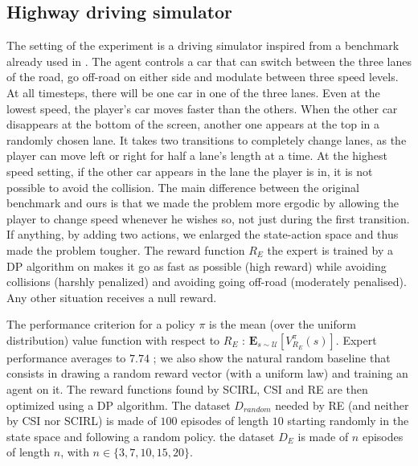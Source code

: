 \documentclass{llncs}
\begin{document}
\subsection{Highway driving simulator}
\label{subsec:highway}
The setting of the experiment is a driving simulator inspired from a benchmark already used in \cite{syed2008apprenticeship,syed2008game}. The agent controls a car that can switch between the three lanes of the road, go off-road on either side and modulate between three speed levels. At all timesteps, there will be one car in one of the three lanes. Even at the lowest speed, the player's car moves faster than the others. When the other car disappears at the bottom of the screen, another one appears at the top in a randomly chosen lane. It takes two transitions to completely change lanes, as the player can move left or right for half a lane's length at a time. At the highest speed setting, if the other car appears in the lane the player is in, it is not possible to avoid the collision. The main difference between the original benchmark \cite{syed2008apprenticeship,syed2008game} and ours is that we made the problem more ergodic by allowing the player to change speed whenever he wishes so, not just during the first transition. If anything, by adding two actions, we enlarged the state-action space and thus made the problem tougher.
The reward function $R_E$ the expert is trained by a DP algorithm on makes it go as fast as possible (high reward) while avoiding collisions (harshly penalized) and avoiding going off-road (moderately penalised). Any other situation receives a null reward.


The performance criterion for a policy $\pi$ is the mean (over the uniform distribution) value function with respect to $R_E$ : $\mathbf{E}_{s\sim\mathcal{U}}[V^{\pi}_{R_E}(s)]$. Expert performance averages to $7.74$ ; we also show the natural random baseline that consists in drawing a random reward vector (with a uniform law) and training an agent on it. The reward functions found by SCIRL, CSI and RE are then optimized using a DP algorithm. The dataset $D_{random}$ needed by RE (and neither by CSI nor SCIRL) is made of $100$ episodes of length $10$ starting randomly in the state space and following a random policy. the dataset $D_E$ is made of $n$ episodes of length $n$, with $n \in \{3,7,10,15,20\}$.
\end{document}
